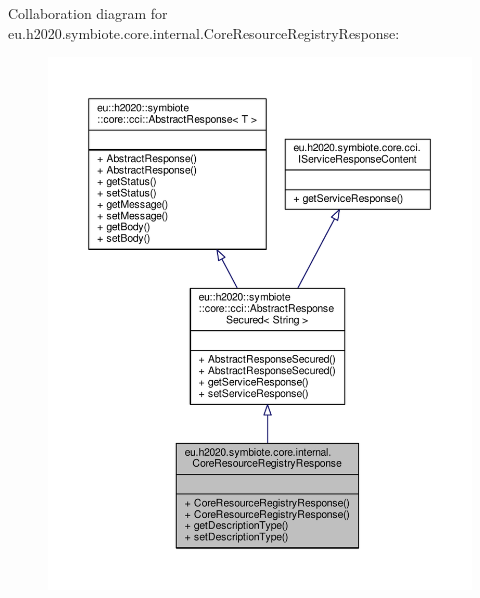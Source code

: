 Collaboration diagram for eu.\+h2020.\+symbiote.\+core.\+internal.\+Core\+Resource\+Registry\+Response\+:\nopagebreak
\begin{figure}[H]
\begin{center}
\leavevmode
\includegraphics[width=350pt]{classeu_1_1h2020_1_1symbiote_1_1core_1_1internal_1_1CoreResourceRegistryResponse__coll__graph}
\end{center}
\end{figure}
